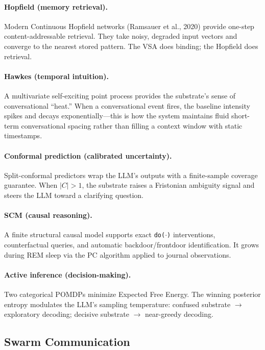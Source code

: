 \paragraph{Hopfield (memory retrieval).}
Modern Continuous Hopfield networks (Ramsauer et al., 2020) provide one-step
content-addressable retrieval.  They take noisy, degraded input vectors and
converge to the nearest stored pattern.  The VSA does binding; the Hopfield does
retrieval.

\paragraph{Hawkes (temporal intuition).}
A multivariate self-exciting point process provides the substrate's sense of
conversational ``heat.''  When a conversational event fires, the baseline
intensity spikes and decays exponentially---this is how the system maintains
fluid short-term conversational spacing rather than filling a context window
with static timestamps.

\paragraph{Conformal prediction (calibrated uncertainty).}
Split-conformal predictors wrap the LLM's outputs with a finite-sample coverage
guarantee.  When $|C| > 1$, the substrate raises a Fristonian ambiguity signal
and steers the LLM toward a clarifying question.

\paragraph{SCM (causal reasoning).}
A finite structural causal model supports exact \texttt{do($\cdot$)}
interventions, counterfactual queries, and automatic backdoor/frontdoor
identification.  It grows during REM sleep via the PC algorithm applied to
journal observations.

\paragraph{Active inference (decision-making).}
Two categorical POMDPs minimize Expected Free Energy.  The winning posterior
entropy modulates the LLM's sampling temperature: confused substrate $\to$
exploratory decoding; decisive substrate $\to$ near-greedy decoding.

\subsection{Swarm Communication}

